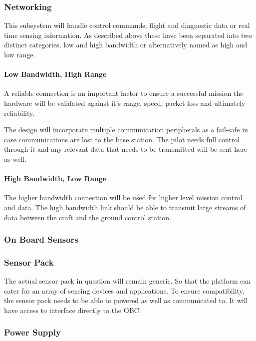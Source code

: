 			\subsubsection{Networking}
			This subsystem will handle control commands, flight and diagnostic data or real time sensing information. As described above these have been separated into two distinct categories, low and high bandwidth or alternatively named as high and low range. 
		
				\paragraph{Low Bandwidth, High Range}
				A reliable connection is an important factor to ensure a successful mission the hardware will be validated against it's range, speed, packet loss and ultimately reliability.
				
				The design will incorporate multiple communication peripherals as a fail-safe in case communications are lost to the base station. The pilot needs full control through it and any relevant data that needs to be transmitted will be sent here as well.
				
				\paragraph{High Bandwidth, Low Range}
				The higher bandwidth connection will be used for higher level mission control and data. The high bandwidth link should be able to transmit large streams of data between the craft and the ground control station. 
		
			\subsubsection{On Board Sensors}
		
			\subsubsection{Sensor Pack}
			The actual sensor pack in question will remain generic. So that the platform can cater for an array of sensing devices and applications. To ensure compatibility, the sensor pack needs to be able to powered as well as communicated to. It will have access to interface directly to the OBC.
			
			\subsubsection{Power Supply}
		
